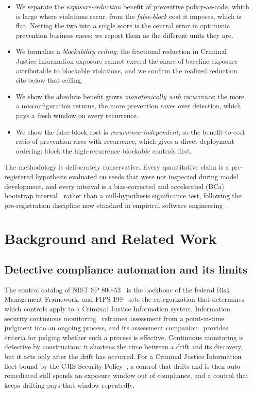 \documentclass[journal]{IEEEtran}
\begin{document}
\begin{itemize}
\item We separate the \emph{exposure-reduction} benefit of preventive policy-as-code, which is
large where violations recur, from the \emph{false-block} cost it imposes, which is flat. Netting
the two into a single score is the central error in optimistic prevention business cases; we report
them as the different units they are.
\item We formalize a \emph{blockability ceiling}: the fractional reduction in Criminal Justice
Information exposure cannot exceed the share of baseline exposure attributable to blockable
violations, and we confirm the realized reduction sits below that ceiling.
\item We show the absolute benefit grows \emph{monotonically with recurrence}: the more a
misconfiguration returns, the more prevention saves over detection, which pays a fresh window on
every recurrence.
\item We show the false-block cost is \emph{recurrence-independent}, so the benefit-to-cost ratio
of prevention rises with recurrence, which gives a direct deployment ordering: block the
high-recurrence blockable controls first.
\end{itemize}

The methodology is deliberately conservative. Every quantitative claim is a pre-registered
hypothesis evaluated on seeds that were not inspected during model development, and every interval
is a bias-corrected and accelerated (BCa) bootstrap
interval~\cite{efron1987bca,efron1994introduction} rather than a null-hypothesis significance test,
following the pre-registration discipline now standard in empirical software
engineering~\cite{wohlin2012experimentation}.

\section{Background and Related Work}

\subsection{Detective compliance automation and its limits}
The control catalog of NIST SP 800-53~\cite{nist80053} is the backbone of the federal Risk
Management Framework, and FIPS 199~\cite{fips199} sets the categorization that determines which
controls apply to a Criminal Justice Information system. Information security continuous
monitoring~\cite{nist80137} reframes assessment from a point-in-time judgment into an ongoing
process, and its assessment companion~\cite{nist80137a} provides criteria for judging whether such
a process is effective. Continuous monitoring is detective by construction: it shortens the time
between a drift and its discovery, but it acts only after the drift has occurred. For a Criminal
Justice Information fleet bound by the CJIS Security Policy~\cite{cjis2023}, a control that drifts
and is then auto-remediated still spends an exposure window out of compliance, and a control that
keeps drifting pays that window repeatedly.
\end{document}

